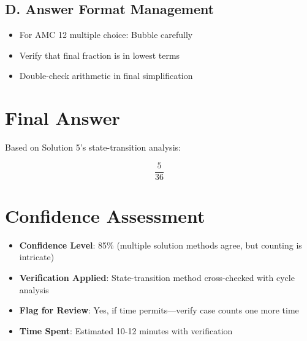 \documentclass[]{article}
\begin{document}
\begin{competitionbox}
\subsection*{D. Answer Format Management}
\begin{itemize}[leftmargin=*]
    \item For AMC 12 multiple choice: Bubble carefully
    \item Verify that final fraction is in lowest terms
    \item Double-check arithmetic in final simplification
\end{itemize}
\end{competitionbox}

\section*{Final Answer}

Based on Solution 5's state-transition analysis:

\[\boxed{\frac{5}{36}}\]

\section*{Confidence Assessment}
\begin{itemize}[leftmargin=*]
    \item \textbf{Confidence Level}: 85\% (multiple solution methods agree, but counting is intricate)
    \item \textbf{Verification Applied}: State-transition method cross-checked with cycle analysis
    \item \textbf{Flag for Review}: Yes, if time permits---verify case counts one more time
    \item \textbf{Time Spent}: Estimated 10-12 minutes with verification
\end{itemize}
\end{document}
